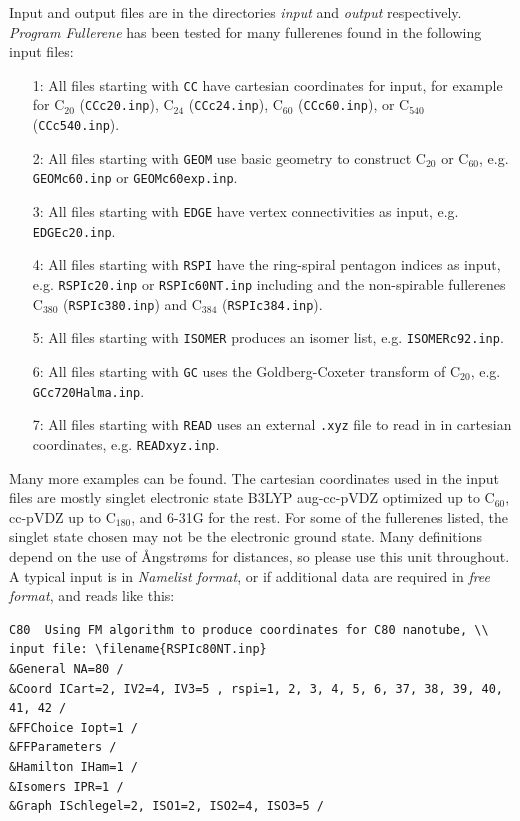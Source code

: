 \documentclass[article,a4paper,twoside]{memoir}
\newcommand{\C}[1]{\ensuremath{\mathrm{C}_{#1}}}
\newcommand{\filename}[1]{\texttt{#1}}
\begin{document}
Input and output files are in the directories \textit{input}  and   \textit{output}  respectively. \textit{Program Fullerene} has been tested 
for many fullerenes found in the following input files:\\
\begin{enumerate}
\item[1:] All files starting with \filename{CC} have cartesian coordinates for input, for example for
\C{20} (\filename{CCc20.inp}), \C{24} (\filename{CCc24.inp}), \C{60} (\filename{CCc60.inp}), or \C{540} (\filename{CCc540.inp}).
\item[2:] All files starting with \filename{GEOM} use basic geometry to construct \C{20} or \C{60}, e.g. \filename{GEOMc60.inp} or \filename{GEOMc60exp.inp}.
\item[3:] All files starting with \filename{EDGE} have vertex connectivities as input, e.g. \filename{EDGEc20.inp}.
\item[4:] All files starting with \filename{RSPI} have the ring-spiral pentagon indices as input, e.g. \filename{RSPIc20.inp} or \filename{RSPIc60NT.inp}
including and the non-spirable fullerenes \C{380} (\filename{RSPIc380.inp}) and \C{384} (\filename{RSPIc384.inp}).
\item[5:] All files starting with \filename{ISOMER} produces an isomer list, e.g. \filename{ISOMERc92.inp}.
\item[6:] All files starting with \filename{GC} uses the Goldberg-Coxeter transform of \C{20}, e.g. \filename{GCc720Halma.inp}.
\item[7:] All files starting with \filename{READ} uses an external \filename{.xyz} file to read in in cartesian coordinates, e.g. \filename{READxyz.inp}.
\end{enumerate}
Many more examples can be found. The cartesian coordinates used in the input files are mostly singlet electronic state 
B3LYP aug-cc-pVDZ optimized up to \C{60}, cc-pVDZ up to \C{180}, and 6-31G for the rest. 
For some of the fullerenes listed, the singlet state chosen may not be the electronic ground state.
Many definitions depend on the use of {\AA}ngstr{\o}ms for distances, so please use this unit throughout. 
A typical input is in \textit{Namelist format}, or if additional data are required in \textit{free format}, and reads like this:
\begin{verbatim}
C80  Using FM algorithm to produce coordinates for C80 nanotube, \\
input file: \filename{RSPIc80NT.inp}
&General NA=80 / 
&Coord ICart=2, IV2=4, IV3=5 , rspi=1, 2, 3, 4, 5, 6, 37, 38, 39, 40, 41, 42 /
&FFChoice Iopt=1 / 
&FFParameters / 
&Hamilton IHam=1 / 
&Isomers IPR=1 / 
&Graph ISchlegel=2, ISO1=2, ISO2=4, ISO3=5 / 
\end{verbatim}
\end{document}

